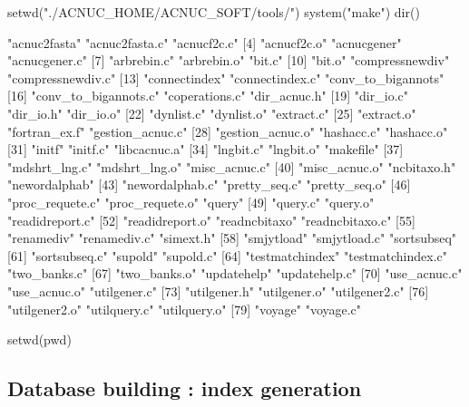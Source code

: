 \documentclass{article}
\begin{document}
\begin{itemize}
\begin{Schunk}
\begin{Sinput}
 setwd("./ACNUC_HOME/ACNUC_SOFT/tools/")
 system("make")
 dir()
\end{Sinput}
\begin{Soutput}
 [1] "acnuc2fasta"         "acnuc2fasta.c"       "acnucf2c.c"         
 [4] "acnucf2c.o"          "acnucgener"          "acnucgener.c"       
 [7] "arbrebin.c"          "arbrebin.o"          "bit.c"              
[10] "bit.o"               "compressnewdiv"      "compressnewdiv.c"   
[13] "connectindex"        "connectindex.c"      "conv_to_bigannots"  
[16] "conv_to_bigannots.c" "coperations.c"       "dir_acnuc.h"        
[19] "dir_io.c"            "dir_io.h"            "dir_io.o"           
[22] "dynlist.c"           "dynlist.o"           "extract.c"          
[25] "extract.o"           "fortran_ex.f"        "gestion_acnuc.c"    
[28] "gestion_acnuc.o"     "hashacc.c"           "hashacc.o"          
[31] "initf"               "initf.c"             "libcacnuc.a"        
[34] "lngbit.c"            "lngbit.o"            "makefile"           
[37] "mdshrt_lng.c"        "mdshrt_lng.o"        "misc_acnuc.c"       
[40] "misc_acnuc.o"        "ncbitaxo.h"          "newordalphab"       
[43] "newordalphab.c"      "pretty_seq.c"        "pretty_seq.o"       
[46] "proc_requete.c"      "proc_requete.o"      "query"              
[49] "query.c"             "query.o"             "readidreport.c"     
[52] "readidreport.o"      "readncbitaxo"        "readncbitaxo.c"     
[55] "renamediv"           "renamediv.c"         "simext.h"           
[58] "smjytload"           "smjytload.c"         "sortsubseq"         
[61] "sortsubseq.c"        "supold"              "supold.c"           
[64] "testmatchindex"      "testmatchindex.c"    "two_banks.c"        
[67] "two_banks.o"         "updatehelp"          "updatehelp.c"       
[70] "use_acnuc.c"         "use_acnuc.o"         "utilgener.c"        
[73] "utilgener.h"         "utilgener.o"         "utilgener2.c"       
[76] "utilgener2.o"        "utilquery.c"         "utilquery.o"        
[79] "voyage"              "voyage.c"           
\end{Soutput}
\begin{Sinput}
 setwd(pwd)
\end{Sinput}
\end{Schunk}

\end{itemize}
 
\subsection{Database building : index generation}
\end{document}
